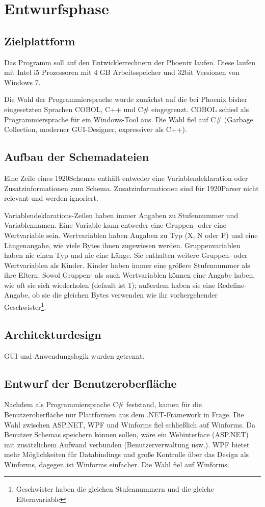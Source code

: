 \section{Entwurfsphase} 
\label{sec:Entwurfsphase}

\subsection{Zielplattform}
\label{sec:Zielplattform}
Das Programm soll auf den Entwicklerrechnern der Phoenix laufen. Diese laufen mit  Intel i5 Prozessoren mit 4 GB Arbeitsspeicher und 32bit Versionen von Windows 7.


Die Wahl der Programmiersprache wurde zunächst auf die bei Phoenix bisher eingesetzten Sprachen COBOL, C++ und C\# eingegrenzt. COBOL schied als Programmiersprache für ein Windows-Tool aus. Die Wahl fiel auf C\# (Garbage Collection, moderner GUI-Designer, expressiver als C++).

\subsection{Aufbau der Schemadateien}
\label{sec:AufbauSchemas}
Eine Zeile eines 1920Schemas enthält entweder eine Variablendeklaration oder Zusatzinformationen zum Schema. Zusatzinformationen sind für 1920Parser nicht relevant und werden ignoriert.

Variablendeklarations-Zeilen haben immer Angaben zu Stufennummer und Variablennamen.
Eine Variable kann entweder eine Gruppen- oder eine Wertvariable sein.
Wertvariablen haben Angaben zu Typ (X, N oder P) und eine Längenangabe, wie viele Bytes ihnen zugewiesen werden.
Gruppenvariablen haben nie einen Typ und nie eine Länge. Sie enthalten weitere Gruppen- oder Wertvariablen als Kinder. Kinder haben immer eine größere Stufennummer als ihre Eltern.
Sowol Gruppen- als auch Wertvariablen können eine Angabe haben, wie oft sie sich wiederholen (default ist 1); außerdem haben sie eine Redefine-Angabe, ob sie die gleichen Bytes verwenden wie ihr vorhergehender Geschwister\footnote{Geschwister haben die gleichen Stufennummern und die gleiche Elternvariable}.


\subsection{Architekturdesign}
\label{sec:Architekturdesign}
GUI und Anwendungslogik wurden getrennt.


\subsection{Entwurf der Benutzeroberfläche}
\label{sec:Benutzeroberflaeche}
Nachdem als Programmiersprache C\# feststand, kamen für die Benutzeroberfläche nur  Plattformen aus dem .NET-Framework in Frage. Die Wahl zwischen ASP.NET, WPF und Winforms fiel schließlich auf Winforms. Da Benutzer Schemas speichern können sollen, wäre ein Webinterface (ASP.NET) mit zusätzlichem Aufwand verbunden (Benutzerverwaltung usw.). WPF bietet mehr Möglichkeiten für Databindings und große Kontrolle über das Design als Winforms, dagegen ist Winforms einfacher. Die Wahl fiel auf Winforms.
